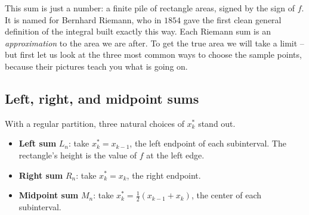 This sum is just a number: a finite pile of rectangle areas, signed by the sign
of $f$. It is named for Bernhard Riemann, who in $1854$ gave the first clean
general definition of the integral built exactly this way. Each Riemann sum is
an \emph{approximation} to the area we are after. To get the true area we will
take a limit -- but first let us look at the three most common ways to choose the
sample points, because their pictures teach you what is going on.

\subsection{Left, right, and midpoint sums}
\label{ch20:lrm}

With a regular partition, three natural choices of $x_k^\ast$ stand out.

\begin{itemize}
\item \textbf{Left sum} $L_n$: take $x_k^\ast = x_{k-1}$, the left endpoint of
each subinterval. The rectangle's height is the value of $f$ at the left edge.
\item \textbf{Right sum} $R_n$: take $x_k^\ast = x_k$, the right endpoint.
\item \textbf{Midpoint sum} $M_n$: take $x_k^\ast = \tfrac{1}{2}(x_{k-1}+x_k)$,
the center of each subinterval.
\end{itemize}

